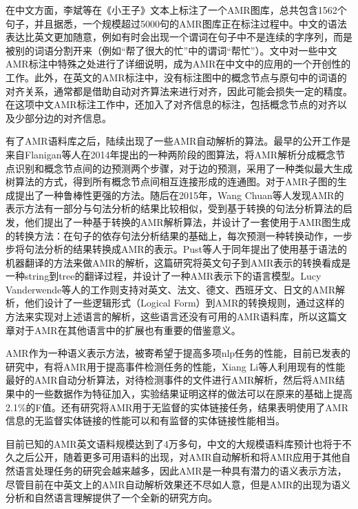\documentclass[master, winfont]{njuthesis}
\begin{document}
在中文方面，李斌等\cite{Li2016Annotating}在《小王子》文本上标注了一个AMR图库，总共包含1562个句子，并且据悉，一个规模超过5000句的AMR图库正在标注过程中。中文的语法表达比英文更加随意，例如有时会出现一个谓词在句子中不是连续的字序列，而是被别的词语分割开来（例如“帮了很大的忙”中的谓词“帮忙”）。文中对一些中文AMR标注中特殊之处进行了详细说明，成为AMR在中文中的应用的一个开创性的工作。此外，在英文的AMR标注中，没有标注图中的概念节点与原句中的词语的对齐关系，通常都是借助自动对齐算法来进行对齐，因此可能会损失一定的精度。在这项中文AMR标注工作中，还加入了对齐信息的标注，包括概念节点的对齐以及少部分边的对齐信息。

有了AMR语料库之后，陆续出现了一些AMR自动解析的算法。最早的公开工作是来自Flanigan等人\cite{Flanigan2014}在2014年提出的一种两阶段的图算法，将AMR解析分成概念节点识别和概念节点间的边预测两个步骤，对于边的预测，采用了一种类似最大生成树算法的方式，得到所有概念节点间相互连接形成的连通图。\cite{Angeli2014}对于AMR子图的生成提出了一种鲁棒性更强的方法。随后在2015年，Wang Chuan\cite{Wang2015}等人发现AMR的表示方法有一部分与句法分析的结果比较相似，受到基于转换的句法分析算法的启发，他们提出了一种基于转换的AMR解析算法，并设计了一套使用于AMR图生成的转换方法：在句子的依存句法分析结果的基础上，每次预测一种转换动作，一步步将句法分析的结果转换成AMR的表示。Pust等人\cite{Pust2015}于同年提出了使用基于语法的机器翻译的方法来做AMR的解析，这篇研究将英文句子到AMR表示的转换看成是一种string到tree的翻译过程，并设计了一种AMR表示下的语言模型。Lucy Vanderwende等人\cite{Vanderwende2015}的工作则支持对英文、法文、德文、西班牙文、日文的AMR解析，他们设计了一些逻辑形式（Logical Form）到AMR的转换规则，通过这样的方法来实现对上述语言的解析，这些语言还没有可用的AMR语料库，所以这篇文章对于AMR在其他语言中的扩展也有重要的借鉴意义。

AMR作为一种语义表示方法，被寄希望于提高多项nlp任务的性能，目前已发表的研究中，有将AMR用于提高事件检测任务的性能\cite{kai2015improving}，Xiang Li等人利用现有的性能最好的AMR自动分析算法，对待检测事件的文件进行AMR解析，然后将AMR结果中的一些数据作为特征加入，实验结果证明这样的做法可以在原来的基础上提高2.1\%的F值。还有研究将AMR用于无监督的实体链接任务\cite{Pan2015}，结果表明使用了AMR信息的无监督实体链接的性能可以和有监督的实体链接性能相当。

目前已知的AMR英文语料规模达到了4万多句，中文的大规模语料库预计也将于不久之后公开，随着更多可用语料的出现，对AMR自动解析和将AMR应用于其他自然语言处理任务的研究会越来越多，因此AMR是一种具有潜力的语义表示方法，尽管目前在中英文上的AMR自动解析效果还不尽如人意，但是AMR的出现为语义分析和自然语言理解提供了一个全新的研究方向。
\end{document}
